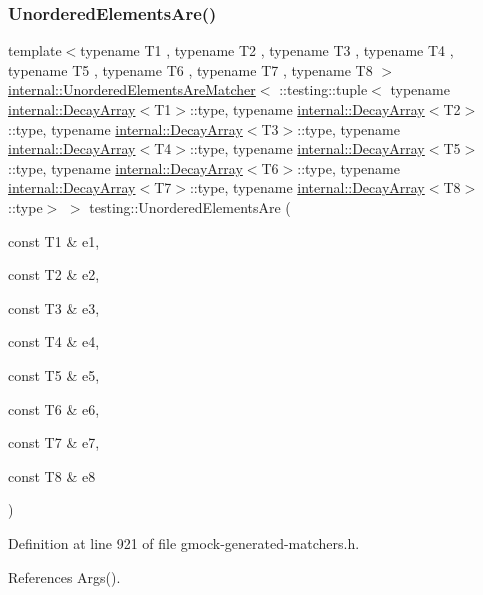 \subsubsection{\texorpdfstring{Unordered\+Elements\+Are()}{UnorderedElementsAre()}\hspace{0.1cm}{\footnotesize\ttfamily [9/11]}}
{\footnotesize\ttfamily template$<$typename T1 , typename T2 , typename T3 , typename T4 , typename T5 , typename T6 , typename T7 , typename T8 $>$ \\
\hyperlink{classtesting_1_1internal_1_1UnorderedElementsAreMatcher}{internal\+::\+Unordered\+Elements\+Are\+Matcher}$<$ \+::testing\+::tuple$<$ typename \hyperlink{structtesting_1_1internal_1_1DecayArray}{internal\+::\+Decay\+Array}$<$T1$>$\+::type, typename \hyperlink{structtesting_1_1internal_1_1DecayArray}{internal\+::\+Decay\+Array}$<$T2$>$\+::type, typename \hyperlink{structtesting_1_1internal_1_1DecayArray}{internal\+::\+Decay\+Array}$<$T3$>$\+::type, typename \hyperlink{structtesting_1_1internal_1_1DecayArray}{internal\+::\+Decay\+Array}$<$T4$>$\+::type, typename \hyperlink{structtesting_1_1internal_1_1DecayArray}{internal\+::\+Decay\+Array}$<$T5$>$\+::type, typename \hyperlink{structtesting_1_1internal_1_1DecayArray}{internal\+::\+Decay\+Array}$<$T6$>$\+::type, typename \hyperlink{structtesting_1_1internal_1_1DecayArray}{internal\+::\+Decay\+Array}$<$T7$>$\+::type, typename \hyperlink{structtesting_1_1internal_1_1DecayArray}{internal\+::\+Decay\+Array}$<$T8$>$\+::type$>$ $>$ testing\+::\+Unordered\+Elements\+Are (\begin{DoxyParamCaption}\item[{const T1 \&}]{e1,  }\item[{const T2 \&}]{e2,  }\item[{const T3 \&}]{e3,  }\item[{const T4 \&}]{e4,  }\item[{const T5 \&}]{e5,  }\item[{const T6 \&}]{e6,  }\item[{const T7 \&}]{e7,  }\item[{const T8 \&}]{e8 }\end{DoxyParamCaption})\hspace{0.3cm}{\ttfamily [inline]}}



Definition at line 921 of file gmock-\/generated-\/matchers.\+h.



References Args().


